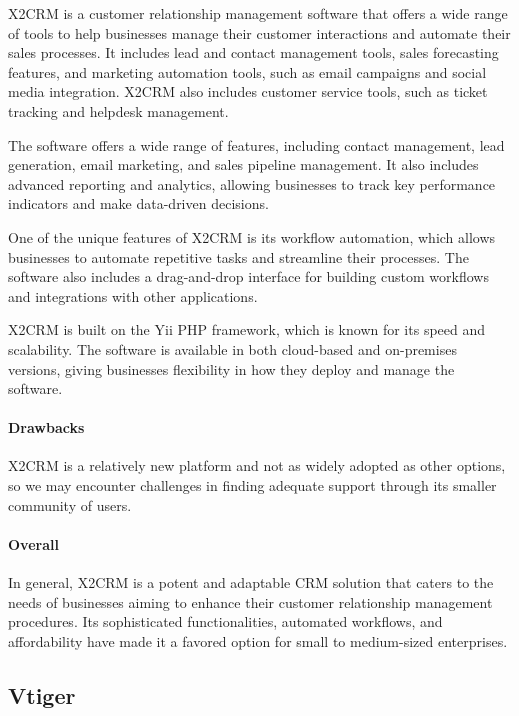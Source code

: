 \documentclass{article}
\begin{document}
X2CRM is a customer relationship management software that offers a wide range of tools to help businesses manage their customer interactions and automate their sales processes. It includes lead and contact management tools, sales forecasting features, and marketing automation tools, such as email campaigns and social media integration. X2CRM also includes customer service tools, such as ticket tracking and helpdesk management.

The software offers a wide range of features, including contact management, lead generation, email marketing, and sales pipeline management. It also includes advanced reporting and analytics, allowing businesses to track key performance indicators and make data-driven decisions.

One of the unique features of X2CRM is its workflow automation, which allows businesses to automate repetitive tasks and streamline their processes. The software also includes a drag-and-drop interface for building custom workflows and integrations with other applications.

X2CRM is built on the Yii PHP framework, which is known for its speed and scalability. The software is available in both cloud-based and on-premises versions, giving businesses flexibility in how they deploy and manage the software.

\paragraph{Drawbacks}

X2CRM is a relatively new platform and not as widely adopted as other options, so we may encounter challenges in finding adequate support through its smaller community of users.

\paragraph{Overall}

In general, X2CRM is a potent and adaptable CRM solution that caters to the needs of businesses aiming to enhance their customer relationship management procedures. Its sophisticated functionalities, automated workflows, and affordability have made it a favored option for small to medium-sized enterprises.

\subsection{Vtiger}
\end{document}
